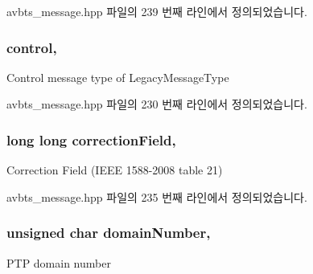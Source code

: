 avbts\+\_\+message.\+hpp 파일의 239 번째 라인에서 정의되었습니다.

\subsubsection[{\texorpdfstring{control}{control}}]{ control\hspace{0.3cm}{\ttfamily [protected]}, {\ttfamily [inherited]}}\hypertarget{class_p_t_p_message_common_a7de6f8422e6ca5ade1aeac73a44ec6f0}{}\label{class_p_t_p_message_common_a7de6f8422e6ca5ade1aeac73a44ec6f0}
Control message type of Legacy\+Message\+Type 

avbts\+\_\+message.\+hpp 파일의 230 번째 라인에서 정의되었습니다.

\subsubsection[{\texorpdfstring{correction\+Field}{correctionField}}]{\setlength{\rightskip}{0pt plus 5cm}long long correction\+Field\hspace{0.3cm}{\ttfamily [protected]}, {\ttfamily [inherited]}}\hypertarget{class_p_t_p_message_common_a635b707dac6610b5b159be5c8ec1891e}{}\label{class_p_t_p_message_common_a635b707dac6610b5b159be5c8ec1891e}
Correction Field (I\+E\+EE 1588-\/2008 table 21) 

avbts\+\_\+message.\+hpp 파일의 235 번째 라인에서 정의되었습니다.

\subsubsection[{\texorpdfstring{domain\+Number}{domainNumber}}]{\setlength{\rightskip}{0pt plus 5cm}unsigned char domain\+Number\hspace{0.3cm}{\ttfamily [protected]}, {\ttfamily [inherited]}}\hypertarget{class_p_t_p_message_common_a0443527ff087aecea2cac4f6e84d189c}{}\label{class_p_t_p_message_common_a0443527ff087aecea2cac4f6e84d189c}
P\+TP domain number 

